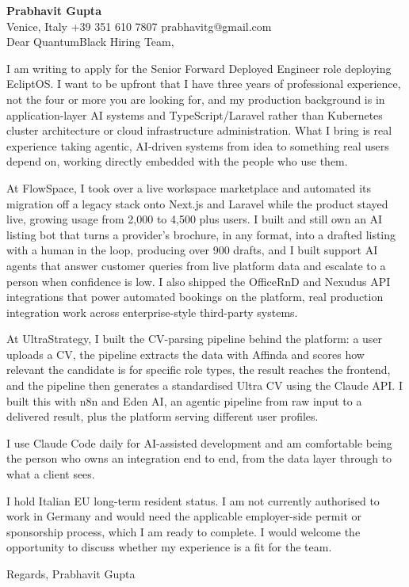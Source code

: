 \documentclass[a4paper,10.5pt]{article}
\begin{document}
\textbf{Prabhavit Gupta}\\
Venice, Italy \textbar{} +39 351 610 7807 \textbar{} prabhavitg@gmail.com\\[10pt]
Dear QuantumBlack Hiring Team,

I am writing to apply for the Senior Forward Deployed Engineer role deploying EcliptOS. I want to be upfront that I have three years of professional experience, not the four or more you are looking for, and my production background is in application-layer AI systems and TypeScript/Laravel rather than Kubernetes cluster architecture or cloud infrastructure administration. What I bring is real experience taking agentic, AI-driven systems from idea to something real users depend on, working directly embedded with the people who use them.

At FlowSpace, I took over a live workspace marketplace and automated its migration off a legacy stack onto Next.js and Laravel while the product stayed live, growing usage from 2,000 to 4,500 plus users. I built and still own an AI listing bot that turns a provider's brochure, in any format, into a drafted listing with a human in the loop, producing over 900 drafts, and I built support AI agents that answer customer queries from live platform data and escalate to a person when confidence is low. I also shipped the OfficeRnD and Nexudus API integrations that power automated bookings on the platform, real production integration work across enterprise-style third-party systems.

At UltraStrategy, I built the CV-parsing pipeline behind the platform: a user uploads a CV, the pipeline extracts the data with Affinda and scores how relevant the candidate is for specific role types, the result reaches the frontend, and the pipeline then generates a standardised Ultra CV using the Claude API. I built this with n8n and Eden AI, an agentic pipeline from raw input to a delivered result, plus the platform serving different user profiles.

I use Claude Code daily for AI-assisted development and am comfortable being the person who owns an integration end to end, from the data layer through to what a client sees.

I hold Italian EU long-term resident status. I am not currently authorised to work in Germany and would need the applicable employer-side permit or sponsorship process, which I am ready to complete. I would welcome the opportunity to discuss whether my experience is a fit for the team.

Regards, Prabhavit Gupta
\end{document}
